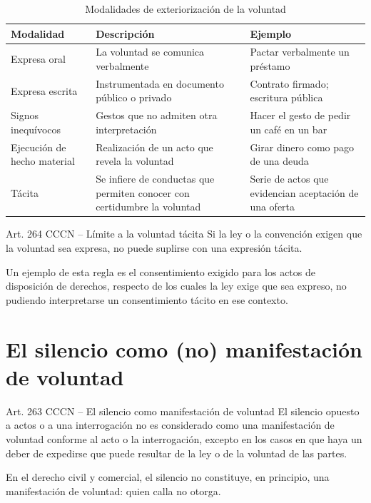 \documentclass[12pt,oneside]{book}
\begin{document}
\begin{table}[H]
\centering
\caption{Modalidades de exteriorización de la voluntad}
\begin{tabularx}{\textwidth}{l X X}
\toprule
\textbf{Modalidad} & \textbf{Descripción} & \textbf{Ejemplo} \\
\midrule
Expresa oral & La voluntad se comunica verbalmente & Pactar verbalmente un préstamo \\
Expresa escrita & Instrumentada en documento público o privado & Contrato firmado; escritura pública \\
Signos inequívocos & Gestos que no admiten otra interpretación & Hacer el gesto de pedir un café en un bar \\
Ejecución de hecho material & Realización de un acto que revela la voluntad & Girar dinero como pago de una deuda \\
Tácita & Se infiere de conductas que permiten conocer con certidumbre la voluntad & Serie de actos que evidencian aceptación de una oferta \\
\bottomrule
\end{tabularx}
\end{table}

\begin{definition}{Art. 264 CCCN -- Límite a la voluntad tácita}
Si la ley o la convención exigen que la voluntad sea expresa, no puede suplirse con una expresión tácita.
\end{definition}

Un ejemplo de esta regla es el consentimiento exigido para los actos de disposición de derechos, respecto de los cuales la ley exige que sea expreso, no pudiendo interpretarse un consentimiento tácito en ese contexto.

\section{El silencio como (no) manifestación de voluntad}

\begin{definition}{Art. 263 CCCN -- El silencio como manifestación de voluntad}
El silencio opuesto a actos o a una interrogación no es considerado como una manifestación de voluntad conforme al acto o la interrogación, excepto en los casos en que haya un deber de expedirse que puede resultar de la ley o de la voluntad de las partes.
\end{definition}

En el derecho civil y comercial, el silencio no constituye, en principio, una manifestación de voluntad: quien calla no otorga.
\end{document}
